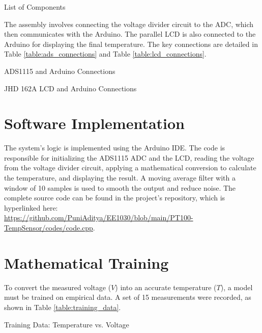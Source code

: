 \documentclass[conference]{IEEEtran}
\begin{document}
\begin{table}[!h]
  \centering
  \caption{List of Components}
  \label{table:list}
  
\end{table}

The assembly involves connecting the voltage divider circuit to the ADC, which then communicates with the Arduino. The parallel LCD is also connected to the Arduino for displaying the final temperature. The key connections are detailed in Table \ref{table:ads_connections} and Table \ref{table:lcd_connections}.

\begin{table}[h!]
  \centering
  \caption{ADS1115 and Arduino Connections}
  \label{table:ads_connections}
  
\end{table}

\begin{table}[h!]
  \centering
  \caption{JHD 162A LCD and Arduino Connections}
  \label{table:lcd_connections}
  
\end{table}

\section{Software Implementation}
The system's logic is implemented using the Arduino IDE. The code is responsible for initializing the ADS1115 ADC and the LCD, reading the voltage from the voltage divider circuit, applying a mathematical conversion to calculate the temperature, and displaying the result. A moving average filter with a window of 10 samples is used to smooth the output and reduce noise. The complete source code can be found in the project's repository, which is hyperlinked here: \\ {\url{https://github.com/PuniAditya/EE1030/blob/main/PT100-TempSensor/codes/code.cpp}}.


\section{Mathematical Training}
To convert the measured voltage ($V$) into an accurate temperature ($T$), a model must be trained on empirical data. A set of 15 measurements were recorded, as shown in Table \ref{table:training_data}.

\begin{table}[!h]
  \centering
  \caption{Training Data: Temperature vs. Voltage}
  \label{table:training_data}
  
\end{table}
\end{document}
